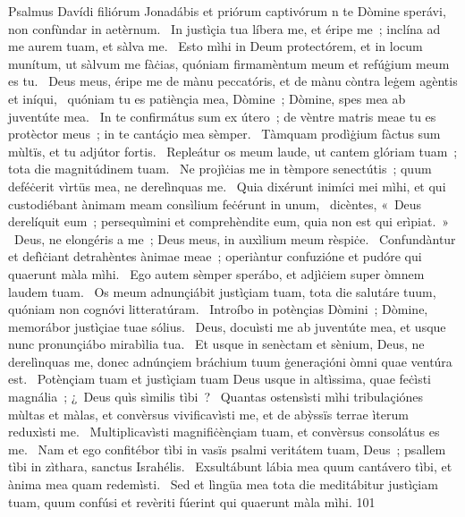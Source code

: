 { Psalmus Davídi filiórum Jonadábis et priórum captivórum}
{%
n te Dòmine sperávi, non confùndar in aetèrnum. 
~In justìçia tua líbera me, et éripe me~; inclína ad me aurem tuam, et sàlva me. 
~Esto mìhi in Deum protectórem, et in locum munítum, ut sàlvum me fàċias, quóniam firmamèntum meum et refúġium meum es tu. 
~Deus meus, éripe me de mànu peccatóris, et de mànu còntra leġem agèntis et iníqui, 
~quóniam tu es patiènçia mea, Dòmine~; Dòmine, spes mea ab juventúte mea. 
~In te confirmátus sum ex útero~; de vèntre matris meae tu es protèctor meus~; in te cantáçio mea sèmper. 
~Tàmquam prodìġium fàctus sum mùltïs, et tu adjútor fortis. 
~Repleátur os meum laude, ut cantem glóriam tuam~; tota die magnitúdinem tuam. 
~Ne projìċias me in tèmpore senectútis~; quum deféċerit vìrtüs mea, ne derelìnquas me. 
~Quia dixérunt inimíci mei mìhi, et qui custodiébant ànimam meam consìlium feċérunt in unum, 
~dicèntes, «~Deus derelíquit eum~; persequìmini et comprehèndite eum, quia non est qui erìpiat.~»
~Deus, ne elongéris a me~; Deus meus, in auxìlium meum rèspiċe. 
~Confundàntur et defìċiant detrahèntes ànimae meae~; operiàntur confuzióne et pudóre qui quaerunt màla mìhi. 
~Ego autem sèmper sperábo, et adjìċiem super òmnem laudem tuam. 
~Os meum adnunçiábit justìçiam tuam, tota die salutáre tuum, quóniam non cognóvi litteratúram. 
~Introíbo in potènçias Dòmini~; Dòmine, memorábor justìçiae tuae sólius. 
~Deus, docuìsti me ab juventúte mea, et usque nunc pronunçiábo mirabìlia tua. 
~Et usque in senèctam et sènium, Deus, ne derelìnquas me, donec adnúnçiem bráchium tuum ġeneraçióni òmni quae ventúra est. 
~Potènçiam tuam et justìçiam tuam Deus usque in altìssima, quae feċìsti magnália~; ¿~Deus quìs sìmilis tìbi~? 
~Quantas ostensìsti mìhi tribulaçiónes mùltas et màlas, et convèrsus vivificavìsti me, et de abỳssïs terrae ìterum reduxìsti me. 
~Multiplicavìsti magnifiċènçiam tuam, et convèrsus consolátus es me. 
~Nam et ego confitébor tìbi in vasïs psalmi veritátem tuam, Deus~; psallem tìbi in zìthara, sanctus Israhélis. 
~Exsultábunt lábia mea quum cantávero tìbi, et ànima mea quam redemìsti. 
~Sed et lìngüa mea tota die meditábitur justìçiam tuam, quum confúsi et revèriti fúerint qui quaerunt màla mìhi. 
}
{10}{1}
